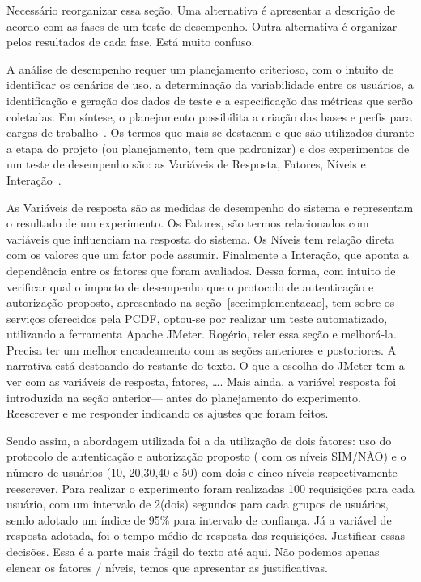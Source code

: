 {\color{red}Necess\'{a}rio reorganizar essa se\c c\~{a}o. Uma alternativa \'{e} apresentar a descri\c c\~{a}o de acordo com as fases de um teste de desempenho. Outra alternativa \'{e} organizar 
pelos resultados de cada fase. Est\'{a} muito confuso.}

{\color{red}A an\'{a}lise de desempenho requer um planejamento criterioso, com o intuito de} identificar os cenários de uso, a determinação da variabilidade entre os usuários, a identificação e geração dos dados de teste e a especificação das métricas que serão coletadas. Em síntese, o planejamento possibilita a cria\c c\~{a}o das bases e 
perfis para cargas de trabalho~\cite{Meier2007}. Os termos que mais se destacam e que são utilizados durante a etapa do {\color{red} projeto (ou planejamento, tem que padronizar)} 
e dos experimentos de um teste de desempenho são: as Variáveis de Resposta, Fatores, Níveis e Interação~\cite{jain1991art}.

As Variáveis de resposta são as medidas de desempenho do sistema e representam o resultado de um experimento. Os Fatores, são termos relacionados com variáveis que influenciam na resposta do sistema. Os Níveis tem relação direta com os valores que um fator pode assumir. Finalmente a Interação, que aponta a dependência entre os fatores que foram avaliados.
Dessa forma, com intuito de verificar qual o impacto de desempenho que o protocolo de autenticação e autorização proposto, apresentado na seção~\ref{sec:implementacao}, tem sobre os serviços oferecidos pela PCDF, optou-se por realizar um teste automatizado, utilizando a ferramenta Apache JMeter. {\color{red}Rog\'{e}rio, reler essa se\c c\~{a}o e melhor\'{a}-la. Precisa 
ter um melhor encadeamento com as se\c c\~{o}es anteriores e postoriores. A narrativa est\'{a} destoando do restante do texto. O que a escolha do JMeter tem a ver com as vari\'{a}veis de resposta, fatores, \ldots. Mais ainda, a vari\'{a}vel resposta foi introduzida na se\c c\~{a}o anterior--- antes do planejamento do experimento. Reescrever e me responder indicando os ajustes que foram feitos}. 

Sendo assim, a abordagem utilizada foi a da utilização de dois fatores: uso do protocolo de autenticação e autorização proposto ({\color{red} com os n\'{i}veis SIM/NÃO}) 
e o número de usuários (10, 20,30,40 e 50) com dois e cinco níveis respectivamente {\color{red}reescrever}. 
Para realizar o experimento foram realizadas 100 requisições para cada usuário, com um intervalo de 2(dois) segundos para cada grupos de usuários, sendo adotado um índice de 95\% para intervalo de confiança. Já a variável de resposta adotada, foi o tempo médio de resposta das requisições. {\color{red}Justificar essas decis\~{o}es. Essa \'{e} a parte mais fr\'{a}gil do texto 
at\'{e} aqui. N\~{a}o podemos apenas elencar os fatores / n\'{i}veis, temos que apresentar as justificativas. }

